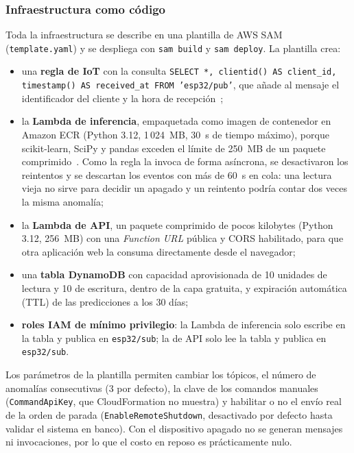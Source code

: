\documentclass[10pt,twocolumn]{article}
\newcommand{\code}[1]{\texttt{\small #1}}
\begin{document}
\subsubsection{Infraestructura como código}
Toda la infraestructura se describe en una plantilla de AWS SAM (\code{template.yaml}) y se despliega
con \code{sam build} y \code{sam deploy}. La plantilla crea:
\begin{itemize}
  \item una \textbf{regla de IoT} con la consulta
        \code{SELECT *, clientid() AS client\_id, timestamp() AS received\_at FROM 'esp32/pub'},
        que añade al mensaje el identificador del cliente y la hora de recepción~\cite{awsrules};
  \item la \textbf{Lambda de inferencia}, empaquetada como imagen de contenedor en Amazon ECR
        (Python 3.12, 1\,024~MB, 30~s de tiempo máximo), porque scikit-learn, SciPy y pandas
        exceden el límite de 250~MB de un paquete comprimido~\cite{awslambda}. Como la regla la
        invoca de forma asíncrona, se desactivaron los reintentos y se descartan los eventos con más
        de 60~s en cola: una lectura vieja no sirve para decidir un apagado y un reintento podría
        contar dos veces la misma anomalía;
  \item la \textbf{Lambda de API}, un paquete comprimido de pocos kilobytes (Python 3.12, 256~MB)
        con una \emph{Function URL} pública y CORS habilitado, para que otra aplicación web la
        consuma directamente desde el navegador;
  \item una \textbf{tabla DynamoDB} con capacidad aprovisionada de 10 unidades de lectura y 10 de
        escritura, dentro de la capa gratuita, y expiración automática (TTL) de las predicciones a
        los 30 días;
  \item \textbf{roles IAM de mínimo privilegio}: la Lambda de inferencia solo escribe en la tabla y
        publica en \code{esp32/sub}; la de API solo lee la tabla y publica en \code{esp32/sub}.
\end{itemize}
Los parámetros de la plantilla permiten cambiar los tópicos, el número de anomalías consecutivas
(3 por defecto), la clave de los comandos manuales (\code{CommandApiKey}, que CloudFormation no
muestra) y habilitar o no el envío real de la orden de parada (\code{EnableRemoteShutdown},
desactivado por defecto hasta validar el sistema en banco). Con el dispositivo apagado no se generan
mensajes ni invocaciones, por lo que el costo en reposo es prácticamente nulo.
\end{document}
